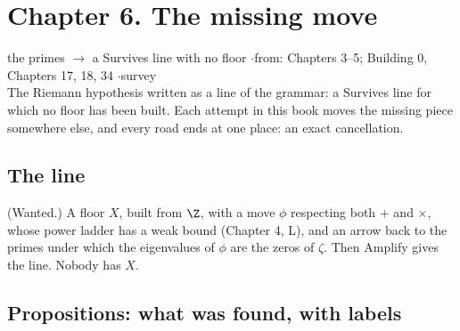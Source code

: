 \section*{Chapter 6. The missing move}
\begin{center}
{\normalsize the primes $\to$ a Survives line with no floor \quad$\cdot$\quad from: Chapters 3--5; Building 0, Chapters 17, 18, 34 \quad$\cdot$\quad survey}\\[4pt]
{\small The Riemann hypothesis written as a line of the grammar: a Survives line for which no floor has been built. Each attempt in this book moves the missing piece somewhere else, and every road ends at one place: an exact cancellation.}
\end{center}

\subsection*{The line}

\begin{lines}
\item[\lab{L}] (Wanted.) A floor $X$, built from $\Z$, with a move $\phi$ respecting both $+$ and $\times$, whose power ladder has a weak bound (Chapter 4, L), and an arrow back to the primes under which the eigenvalues of $\phi$ are the zeros of $\zeta$. Then Amplify gives the line. Nobody has $X$.
\end{lines}

\subsection*{Propositions: what was found, with labels}

